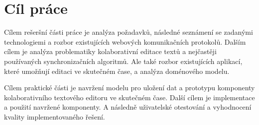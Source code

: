 
\chapter{Cíl práce}

Cílem rešeršní části práce je analýza požadavků, následné seznámení se zadanými technologiemi a rozbor existujících webových komunikačních protokolů.
Dalším cílem je analýza problematiky kolaborativní editace textů a nejčastěji používaných synchronizačních algoritmů.
Ale také rozbor existujících aplikací, které umožňují editaci ve skutečném čase, a analýza doménového modelu.




Cílem praktické části je navržení modelu pro uložení dat a prototypu komponenty kolaborativního textového editoru ve skutečném čase.
Další cílem je implementace a použití navržené komponenty.
A následně uživatelské otestování a vyhodnocení kvality implementovaného řešení.

